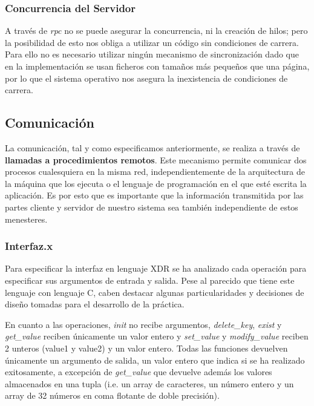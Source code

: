 \documentclass[]{article}
\begin{document}
\subsubsection{Concurrencia del Servidor}
\label{subsec::concurrencia_servidor}
A través de \textit{rpc} no se puede asegurar la concurrencia, ni la creación de hilos; pero la posibilidad de esto nos obliga a utilizar un código sin condiciones de carrera. Para ello no es necesario utilizar ningún mecanismo de sincronización dado que en la implementación se usan ficheros con tamaños más pequeños que una página, por lo que el sistema operativo nos asegura la inexistencia de condiciones de carrera.

\subsection{Comunicación}
\label{subsec:comunicacion}
La comunicación, tal y como especificamos anteriormente, se realiza a través de \textbf{llamadas a procedimientos remotos}. Este mecanismo permite comunicar dos procesos cualesquiera en la misma red, independientemente de la arquitectura de la máquina que los ejecuta o el lenguaje de programación en el que esté escrita la aplicación. Es por esto que es importante que la información transmitida por las partes cliente y servidor de nuestro sistema sea también independiente de estos menesteres. 

\subsubsection{Interfaz.x}
\label{subsec:interfaz.x}
Para especificar la interfaz en lenguaje XDR se ha analizado cada operación para especificar sus argumentos de entrada y salida. Pese al parecido que tiene este lenguaje con lenguaje C, caben destacar algunas particularidades y decisiones de diseño tomadas para el desarrollo de la práctica. 

En cuanto a las operaciones, \textit{init} no recibe argumentos, \textit{delete\_key}, \textit{exist} y \textit{get\_value} reciben únicamente un valor entero y \textit{set\_value} y \textit{modify\_value} reciben 2 unteros (value1 y value2) y un valor entero. Todas las funciones devuelven únicamente un argumento de salida, un valor entero que indica si se ha realizado exitosamente, a excepción de \textit{get\_value} que devuelve además los valores almacenados en una tupla (i.e. un array de caracteres, un número entero y un array de 32 números en coma flotante de doble precisión). 
\end{document}
